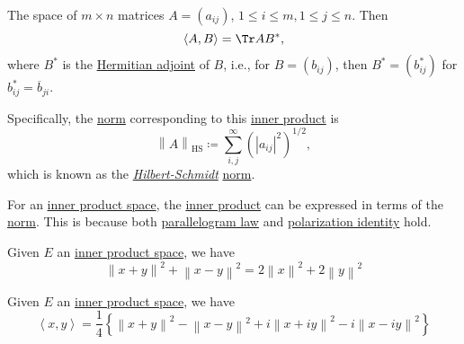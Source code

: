 \begin{eg}
	The space of \(m \times n\) matrices \(A = (a_{ij} )\), \(1 \leq i\leq m, 1 \leq j\leq n\). Then
	\[
		\left\langle A, B \right\rangle = \Tr A B^{\ast},
	\]
	where \(B^{\ast} \) is the \href{https://en.wikipedia.org/wiki/Hermitian_adjoint}{Hermitian adjoint} of \(B\), i.e., for \(B = (b_{ij})\), then \(B^{\ast} = (b^{\ast} _{ij})\) for \(b^{\ast} _{ij} = \overline{b}_{ji}\).

	\begin{remark}
		Specifically, the \hyperref[def:norm]{norm} corresponding to this \hyperref[def:inner-product]{inner product} is
		\[
			\left\lVert A\right\rVert _{\mathrm{HS} }\coloneqq \sum_{i, j}^{\infty} \left(\left\vert a_{ij}  \right\vert ^{2} \right)^{1 / 2},
		\]
		which is known as the \href{https://en.wikipedia.org/wiki/Hilbert%E2%80%93Schmidt_operator}{\emph{Hilbert-Schmidt}} \hyperref[def:norm]{norm}.
	\end{remark}
\end{eg}

For an \hyperref[def:inner-product-space]{inner product space}, the \hyperref[def:inner-product]{inner product} can be expressed in terms of the \hyperref[def:norm]{norm}. This is because both \hyperref[lma:parallelogram-law]{parallelogram law} and \hyperref[lma:polatization-identity]{polarization identity} hold.

\begin{lemma}\label{lma:parallelogram-law}
	Given \(E\) an \hyperref[def:inner-product-space]{inner product space}, we have
	\[
		\left\lVert x+y\right\rVert ^{2} + \left\lVert x-y\right\rVert ^{2} = 2\left\lVert x\right\rVert ^{2} + 2\left\lVert y\right\rVert ^{2}
	\]
\end{lemma}

\begin{lemma}\label{lma:polatization-identity}
	Given \(E\) an \hyperref[def:inner-product-space]{inner product space}, we have
	\[
		\left\langle x, y \right\rangle = \frac{1}{4}\left\{ \left\lVert x+y\right\rVert ^{2} - \left\lVert x-y\right\rVert ^{2} + i \left\lVert x+iy\right\rVert ^{2} - i\left\lVert x-iy\right\rVert ^{2}  \right\}
	\]
\end{lemma}